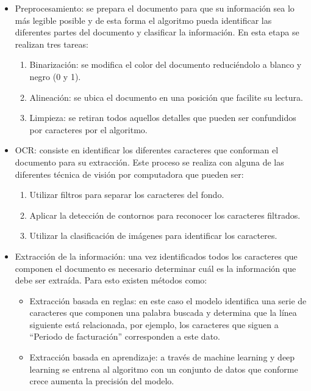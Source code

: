 \documentclass[
11pt, %
]{charter}
\begin{document}
\begin{•}
\begin{itemize}
\item Preprocesamiento: se prepara el documento para que su información sea lo más legible posible y de esta forma el algoritmo pueda identificar las diferentes partes del documento y clasificar la información. En esta etapa se realizan tres tareas:
\begin{enumerate}
\item Binarización: se modifica el color del documento reduciéndolo a blanco y negro (0 y 1).
\item Alineación: se ubica el documento en una posición que facilite su lectura.
\item Limpieza: se retiran todos aquellos detalles que pueden ser confundidos por caracteres por el algoritmo.
\end{enumerate}

\item OCR: consiste en identificar los diferentes caracteres que conforman el documento para su extracción. Este proceso se realiza con alguna de las diferentes técnica de visión por computadora que pueden ser:

\begin{enumerate}
\item Utilizar filtros para separar los caracteres del fondo.
\item Aplicar la detección de contornos para reconocer los caracteres filtrados.
\item Utilizar la clasificación de imágenes para identificar los caracteres.
\end{enumerate}

\item Extracción de la información: una vez identificados todos los caracteres que componen el documento es necesario determinar cuál es la información que debe ser extraída. Para esto existen métodos como:

\begin{itemize}

\item Extracción basada en reglas: en este caso el modelo identifica una serie de caracteres que componen una palabra buscada y determina que la línea siguiente está relacionada, por ejemplo, los caracteres que siguen a “Periodo de facturación” corresponden a este dato.
\item Extracción basada en aprendizaje: a través de machine learning y deep learning se entrena al algoritmo con un conjunto de datos que conforme crece aumenta la precisión del modelo.
\end{itemize}


\end{itemize}
\end{•}
\end{document}
